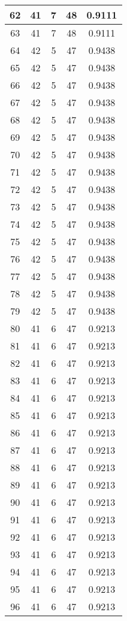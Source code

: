 \documentclass[letterpaper, 12pt]{article}
\begin{document}
\begin{longtable}{|c|c|c|c|c|}
\hline
62 & 41 & 7 & 48 & 0.9111 \\
\hline
63 & 41 & 7 & 48 & 0.9111 \\
\hline
64 & 42 & 5 & 47 & 0.9438 \\
\hline
65 & 42 & 5 & 47 & 0.9438 \\
\hline
66 & 42 & 5 & 47 & 0.9438 \\
\hline
67 & 42 & 5 & 47 & 0.9438 \\
\hline
68 & 42 & 5 & 47 & 0.9438 \\
\hline
69 & 42 & 5 & 47 & 0.9438 \\
\hline
70 & 42 & 5 & 47 & 0.9438 \\
\hline
71 & 42 & 5 & 47 & 0.9438 \\
\hline
72 & 42 & 5 & 47 & 0.9438 \\
\hline
73 & 42 & 5 & 47 & 0.9438 \\
\hline
74 & 42 & 5 & 47 & 0.9438 \\
\hline
75 & 42 & 5 & 47 & 0.9438 \\
\hline
76 & 42 & 5 & 47 & 0.9438 \\
\hline
77 & 42 & 5 & 47 & 0.9438 \\
\hline
78 & 42 & 5 & 47 & 0.9438 \\
\hline
79 & 42 & 5 & 47 & 0.9438 \\
\hline
80 & 41 & 6 & 47 & 0.9213 \\
\hline
81 & 41 & 6 & 47 & 0.9213 \\
\hline
82 & 41 & 6 & 47 & 0.9213 \\
\hline
83 & 41 & 6 & 47 & 0.9213 \\
\hline
84 & 41 & 6 & 47 & 0.9213 \\
\hline
85 & 41 & 6 & 47 & 0.9213 \\
\hline
86 & 41 & 6 & 47 & 0.9213 \\
\hline
87 & 41 & 6 & 47 & 0.9213 \\
\hline
88 & 41 & 6 & 47 & 0.9213 \\
\hline
89 & 41 & 6 & 47 & 0.9213 \\
\hline
90 & 41 & 6 & 47 & 0.9213 \\
\hline
91 & 41 & 6 & 47 & 0.9213 \\
\hline
92 & 41 & 6 & 47 & 0.9213 \\
\hline
93 & 41 & 6 & 47 & 0.9213 \\
\hline
94 & 41 & 6 & 47 & 0.9213 \\
\hline
95 & 41 & 6 & 47 & 0.9213 \\
\hline
96 & 41 & 6 & 47 & 0.9213 \\

\end{longtable}
\end{document}
